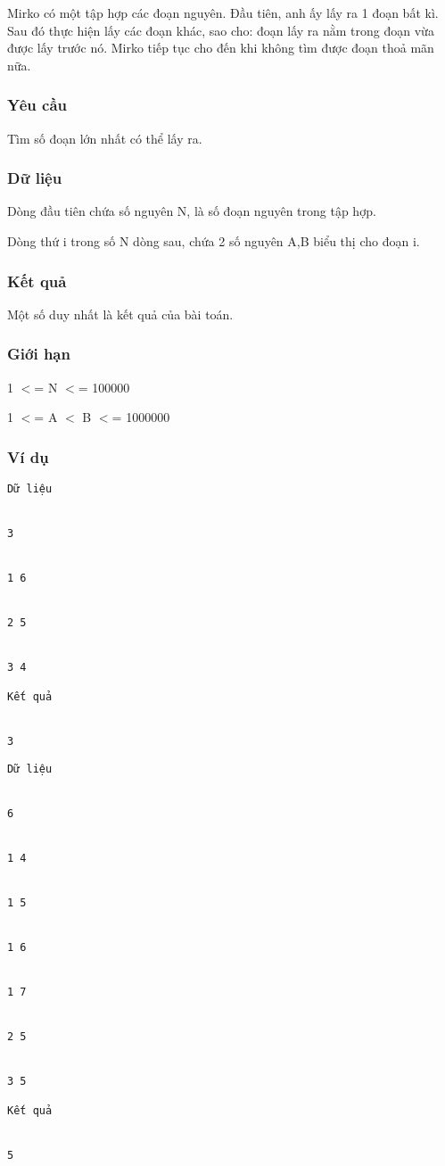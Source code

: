 



   Mirko có một tập hợp các đoạn nguyên. Đầu tiên, anh ấy lấy ra 1 đoạn bất kì. Sau đó thực hiện lấy các đoạn khác, sao cho: đoạn lấy ra nằm trong đoạn vừa được lấy trước nó. Mirko tiếp tục cho đến khi không tìm được đoạn thoả mãn nữa.  

\subsubsection{   Yêu cầu  }

   Tìm số đoạn lớn nhất có thể lấy ra.  

\subsubsection{   Dữ liệu  }

   Dòng đầu tiên chứa số nguyên N, là số đoạn nguyên trong tập hợp.  

   Dòng thứ i trong số N dòng sau, chứa 2 số nguyên A,B  biểu thị cho đoạn i.  

\subsubsection{   Kết quả  }

   Một số duy nhất là kết quả của bài toán.  

\subsubsection{   Giới hạn  }

   1 $<$= N $<$= 100000  

   1 $<$= A $<$ B $<$= 1000000  

\subsubsection{   Ví dụ  }
\begin{verbatim}
Dữ liệu


3


1 6


2 5


3 4
 
Kết quả


3
\end{verbatim}
\begin{verbatim}
Dữ liệu


6


1 4


1 5


1 6


1 7 


2 5 


3 5
 
Kết quả


5
\end{verbatim}